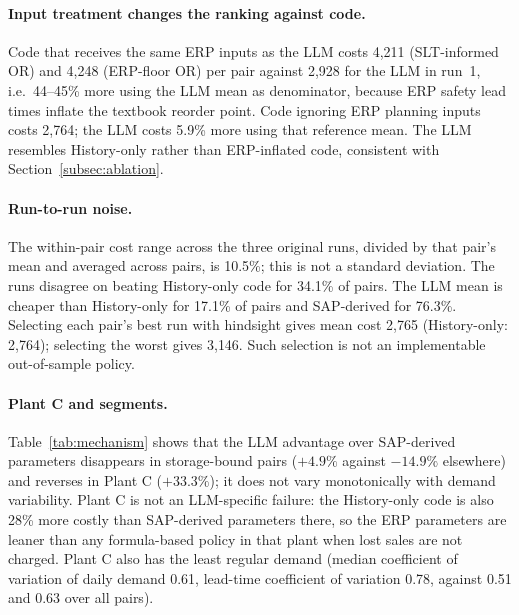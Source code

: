 \documentclass[preprint,12pt,nonatbib]{elsarticle}
\begin{document}
\paragraph{Input treatment changes the ranking against code.}
Code that receives the same ERP inputs as the LLM costs 4{,}211 (SLT-informed OR) and 4{,}248 (ERP-floor OR) per pair against 2{,}928 for the LLM in run~1, i.e.\ 44--45\% more using the LLM mean as denominator, because ERP safety lead times inflate the textbook reorder point. Code ignoring ERP planning inputs costs 2{,}764; the LLM costs 5.9\% more using that reference mean. The LLM resembles History-only rather than ERP-inflated code, consistent with Section~\ref{subsec:ablation}.

\paragraph{Run-to-run noise.}
The within-pair cost range across the three original runs, divided by that pair's mean and averaged across pairs, is 10.5\%; this is not a standard deviation. The runs disagree on beating History-only code for 34.1\% of pairs. The LLM mean is cheaper than History-only for 17.1\% of pairs and SAP-derived for 76.3\%. Selecting each pair's best run with hindsight gives mean cost 2{,}765 (History-only: 2{,}764); selecting the worst gives 3{,}146. Such selection is not an implementable out-of-sample policy.

\paragraph{Plant C and segments.}
Table~\ref{tab:mechanism} shows that the LLM advantage over SAP-derived parameters disappears in storage-bound pairs ($+4.9\%$ against $-14.9\%$ elsewhere) and reverses in Plant C ($+33.3\%$); it does not vary monotonically with demand variability. Plant C is not an LLM-specific failure: the History-only code is also 28\% more costly than SAP-derived parameters there, so the ERP parameters are leaner than any formula-based policy in that plant when lost sales are not charged. Plant C also has the least regular demand (median coefficient of variation of daily demand 0.61, lead-time coefficient of variation 0.78, against 0.51 and 0.63 over all pairs).
\end{document}

